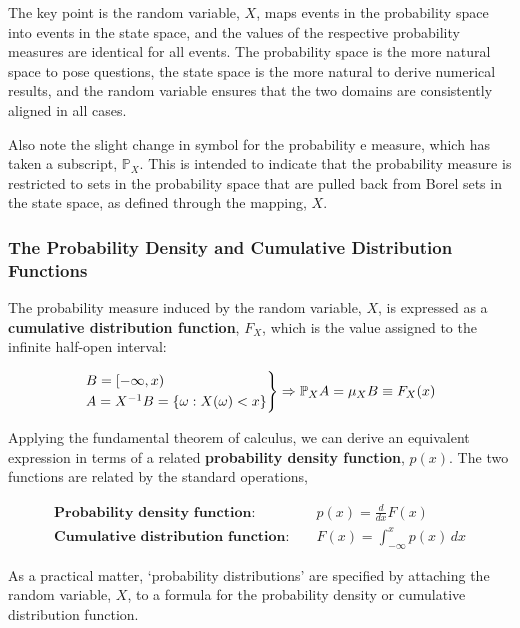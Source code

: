 \documentclass[12pt, twoside, draft]{article}
\begin{document}
The key point is the random variable, $X$, maps events in the probability space into events in the state space, and the values of the respective probability measures are identical for all events.  The probability space is the more natural space to pose questions, the state space is the more natural to derive numerical results, and the random variable ensures that the two domains are consistently aligned in all cases.

Also note the slight change in symbol for the probability e measure, which has taken a subscript, $\mathbb{P}_X$.  This is intended to indicate that the probability measure is restricted to sets in the probability space that are pulled back from Borel sets in the state space, as defined through the mapping, $X$.

\subsubsection{The Probability Density and Cumulative Distribution Functions}
The probability measure induced by the random variable, $X$, is expressed as a \textbf{cumulative distribution function}, $F_X$, which is the value assigned to the infinite half-open interval:

\begin{equation}
\begin{rcases}
B = [-\infty, x) \\
A = X^{-1}B = \{\omega: X(\omega) < x \} \\
\end{rcases} \Rightarrow
\mathbb{P}_X A = \mu_X B \equiv F_X(x)
\end{equation}

Applying the fundamental theorem of calculus, we can derive an equivalent expression in terms of a related \textbf{probability density function}, $p(x)$.  The two functions are related by the standard operations,

\begin{align}
\textbf{Probability density function: } && p(x) = \frac{d}{dx} F(x) \hspace{21pt} \\
\textbf{Cumulative distribution function: } && F(x) = \int_{-\infty}^x p(x) \,dx
\end{align}

As a practical matter, `probability distributions' are specified by attaching the random variable, $X$, to a formula for the probability density or cumulative distribution function.
\end{document}
